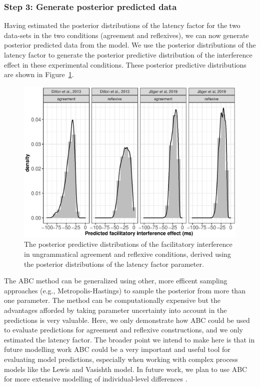 \documentclass{cambridge7A}\usepackage[]{graphicx}\usepackage[]{color}
\makeatletter
\def\maxwidth{ %
  \ifdim\Gin@nat@width>\linewidth
    \linewidth
  \else
    \Gin@nat@width
  \fi
}
\newenvironment{knitrout}{}{} %
\makeatother
\begin{document}
\subsubsection{Step 3: Generate posterior predicted data}

Having estimated the posterior distributions of the latency factor for the two data-sets in the two conditions (agreement and reflexives), we can now  generate posterior predicted data from the model. We use the posterior distributions of the latency factor to generate the posterior predictive distribution of the interference effect in these experimental conditions.
These posterior predictive distributions are shown in Figure~\ref{fig:ppmeansvalues}. 

\begin{figure}[!htbp]
\centering
\begin{knitrout}
\color{fgcolor}

{\centering \includegraphics[width=\maxwidth]{figures/fig-plotppdistrns-1} 

}



\end{knitrout}
\caption{The posterior predictive distributions of the facilitatory interference in ungrammatical agreement and reflexive conditions, derived using the posterior distributions of the latency factor parameter.}\label{fig:ppmeansvalues}
\end{figure}

The ABC method can be generalized using other, more efficent sampling approaches (e.g., Metropolis-Hastings) to sample the posterior from more than one parameter. The method can be computationally expensive but the advantages afforded by taking parameter uncertainty into account in the predictions is very valuable. Here, we only demonstrate how ABC could be used to evaluate predictions for agreement and reflexive constructions, and we only estimated the latency factor. The broader point we intend to make here is that in future modelling work ABC could be a very important and useful tool for evaluating model predictions, especially when working with complex process models like the Lewis and Vasishth model. In future work, we plan to use ABC for more extensive modelling of individual-level differences \citep{YadavEtAlAMLaP2020}.
\end{document}
